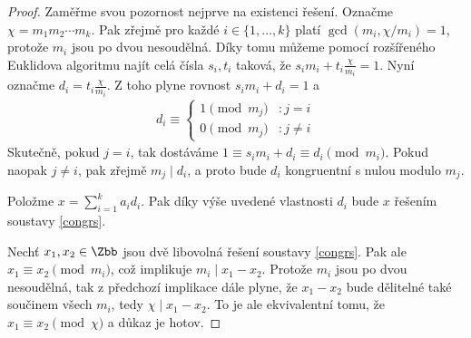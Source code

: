 \begin{proof}
Zaměřme svou pozornost nejprve na existenci řešení. Označme
$ \chi = m_1 m_2 \cdots m_k $. Pak zřejmě pro každé $ i \in \{1,\dots,k\} $
platí $ \gcd(m_i, \chi / m_i) = 1 $, protože $ m_i $ jsou po dvou nesoudělná.
Díky tomu můžeme pomocí rozšířeného Euklidova algoritmu najít celá čísla
$ s_i, t_i $ taková, že $ s_i m_i + t_i \frac{\chi}{m_i} = 1 $. Nyní označme
$ d_i = t_i \frac{\chi}{m_i} $. Z toho plyne rovnost $ s_i m_i + d_i = 1 $ a
\begin{align*}
d_i \equiv
\left\{
  \begin{array}{lr}
    1 \pmod{ m_j } & : j = i \\
    0 \pmod{ m_j }  & : j \neq i
  \end{array}
\right.
\end{align*}
Skutečně, pokud $ j = i $, tak dostáváme
$ 1 \equiv s_i m_i + d_i \equiv d_i \pmod{m_i} $. Pokud naopak $ j \neq i $, pak
zřejmě $ m_j \mid d_i $, a proto bude $ d_i $ kongruentní s nulou modulo $ m_j $.

Položme $ x = \sum\limits_{i = 1}^{k} a_i d_i $. Pak díky výše uvedené
vlastnosti $ d_i $ bude $ x $ řešením soustavy \eqref{congrs}.

Nechť $ x_1, x_2 \in \Zbb $ jsou dvě libovolná řešení soustavy \eqref{congrs}.
Pak ale $ x_1 \equiv x_2 \pmod{m_i} $, což implikuje $ m_i \mid x_1 - x_2 $.
Protože $ m_i $ jsou po dvou nesoudělná, tak z předchozí implikace dále plyne, že
$ x_1 - x_2 $ bude dělitelné také součinem všech $ m_i $, tedy
$ \chi \mid x_1 - x_2 $. To je ale ekvivalentní tomu, že
$ x_1 \equiv x_2 \pmod{\chi} $ a důkaz je hotov.
\end{proof}

